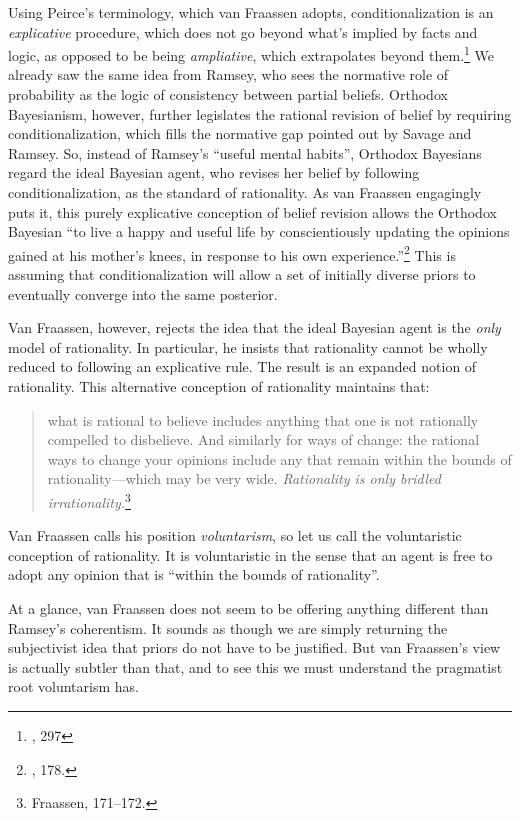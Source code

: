 Using Peirce's terminology, which van Fraassen adopts,
conditionalization is an \emph{explicative} procedure, which does not go
beyond what's implied by facts and logic, as opposed to be being
\emph{ampliative}, which extrapolates beyond them.\footnote{\cite{probabilityofinduction}, 297} We already saw the same idea from Ramsey,
who sees the normative role of probability as the logic of consistency
between partial beliefs. Orthodox Bayesianism, however, further
legislates the rational revision of belief by requiring
conditionalization, which fills the normative gap pointed out by Savage
and Ramsey. So, instead of Ramsey's ``useful mental habits'', Orthodox
Bayesians regard the ideal Bayesian agent, who revises her belief by
following conditionalization, as the standard of rationality. As van
Fraassen engagingly puts it, this purely explicative conception of
belief revision allows the Orthodox Bayesian ``to live a happy and
useful life by conscientiously updating the opinions gained at his
mother's knees, in response to his own experience.''\footnote{\cite{bvflaws}, 178.} This is assuming that
conditionalization will allow a set of initially diverse priors to
eventually converge into the same posterior.

Van Fraassen, however, rejects the idea that the ideal Bayesian agent is
the \emph{only} model of rationality. In particular, he insists that
rationality cannot be wholly reduced to following an explicative rule.
The result is an expanded notion of rationality. This alternative
conception of rationality maintains that:

\begin{quote}
what is rational to believe includes anything that one is not rationally
compelled to disbelieve. And similarly for ways of change: the rational
ways to change your opinions include any that remain within the bounds
of rationality---which may be very wide. \emph{Rationality is only
bridled irrationality.}\footnote{Fraassen, 171--172.}
\end{quote}

Van Fraassen calls his position \emph{voluntarism}, so let us call the
voluntaristic conception of rationality. It is voluntaristic in the
sense that an agent is free to adopt any opinion that is ``within the
bounds of rationality''.

At a glance, van Fraassen does not seem to be offering anything
different than Ramsey's coherentism. It sounds as though we are simply
returning the subjectivist idea that priors do not have to be justified.
But van Fraassen's view is actually subtler than that, and to see this
we must understand the pragmatist root voluntarism has.

